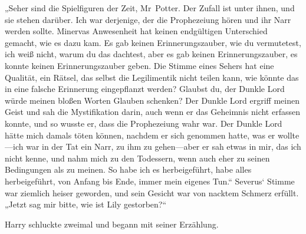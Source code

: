 „Seher sind die Spielfiguren der Zeit, Mr~Potter. Der Zufall ist unter ihnen, und sie stehen darüber. Ich war derjenige, der die Prophezeiung hören und ihr Narr werden sollte. Minervas Anwesenheit hat keinen endgültigen Unterschied gemacht, wie es dazu kam. Es gab keinen Erinnerungszauber, wie du vermutetest, ich weiß nicht, warum du das dachtest, aber es gab keinen Erinnerungszauber, es konnte keinen Erinnerungszauber geben. Die Stimme eines Sehers hat eine Qualität, ein Rätsel, das selbst die Legilimentik nicht teilen kann, wie könnte das in eine falsche Erinnerung eingepflanzt werden? Glaubst du, der Dunkle Lord würde meinen bloßen Worten Glauben schenken? Der Dunkle Lord ergriff meinen Geist und sah die Mystifikation darin, auch wenn er das Geheimnis nicht erfassen konnte, und so wusste er, dass die Prophezeiung wahr war. Der Dunkle Lord hätte mich damals töten können, nachdem er sich genommen hatte, was er wollte—ich war in der Tat ein Narr, zu ihm zu gehen—aber er sah etwas in mir, das ich nicht kenne, und nahm mich zu den Todessern, wenn auch eher zu seinen Bedingungen als zu meinen. So habe ich es herbeigeführt, habe alles herbeigeführt, von Anfang bis Ende, immer mein eigenes Tun.“
Severus‘ Stimme war ziemlich heiser geworden, und sein Gesicht war von nacktem Schmerz erfüllt.
„Jetzt sag mir bitte, wie ist Lily gestorben?“

Harry schluckte zweimal und begann mit seiner Erzählung.

